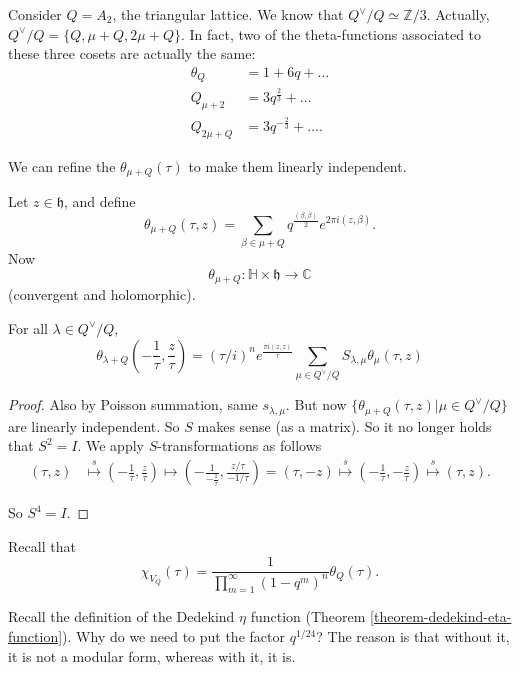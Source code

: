 \begin{example}
\label{example-a2-theta-function}
Consider $Q=A_2$, the triangular lattice.
We know that $Q^\vee/Q\simeq\mathbb{Z}/3$.
Actually, $Q^\vee/Q=\{Q,\mu+Q,2\mu+Q\}$.
In fact, two of the theta-functions
associated to these
three cosets are actually the same:
$$
\begin{aligned}
\theta_Q&=1+6q+\ldots\\
Q_{\mu+2}&=3q^{\frac{2}{3}}+\ldots\\
Q_{2\mu+Q}&=3q^{-\frac{2}{3}}+\ldots.
\end{aligned}
$$

\noindent
We can refine the $\theta_{\mu+Q}(\tau)$
to make them linearly independent.

Let $z \in \mathfrak{h}$, and define
$$
\theta_{\mu+Q}(\tau,z)=\sum_{\beta \in
\mu+Q}q^{\frac{(\beta,\beta)}{2}}
e^{2\pi i(z,\beta)}.
$$
Now
$$
\theta_{\mu+Q}:\mathbb{H}\times\mathfrak{h}
\to\mathbb{C}
$$
(convergent and holomorphic).
\end{example}

\begin{proposition}
\label{proposition-duplicate-5}
For all $\lambda \in Q^\vee/Q$,
$$
\theta_{\lambda+Q}\left(-\frac{1}{\tau},
\frac{z}{\tau}\right)
=(\tau/i)^ne^{\frac{\pi i(z,z)}{\tau}}
\sum_{\mu \in
Q^\vee/Q}S_{\lambda,\mu}\theta_\mu(\tau,z)
$$
\end{proposition}

\begin{proof}
Also by Poisson summation, same
$s_{\lambda,\mu}$.
But now $\{\theta_{\mu+Q}(\tau,z)|\mu \in
Q^\vee/Q\}$
are linearly independent. So $S$ makes sense
(as a matrix).
So it no longer holds that $S^2=I$.
We apply $S$-transformations as follows
$$
\begin{aligned}
(\tau,z)&\overset{s}{\mapsto
}\left(-\frac{1}{\tau},\frac{z}{\tau}\right)
\mapsto
\left(-\frac{1}{-\frac{1}{\tau}},\frac{z/
\tau}{-1/\tau}\right)
=(\tau,-z)
\overset{s}{\mapsto
}\left(-\frac{1}{\tau},-\frac{z}{\tau}\right)
\overset{s}{\mapsto }(\tau,z).
\end{aligned}
$$

\noindent
So $S^4=I$.
\end{proof}

\noindent
Recall that
$$
\chi_{V_Q}(\tau)=\frac{1}{\prod_{m=1}
^\infty(1-q^m)^n}\theta_Q(\tau).
$$

Recall the definition of the Dedekind $\eta$
function
(Theorem
\ref{theorem-dedekind-eta-function}).
Why do we need to put the factor $q^{1/24}$?
The reason is that without it, it is not a
modular form,
whereas with it, it is.

